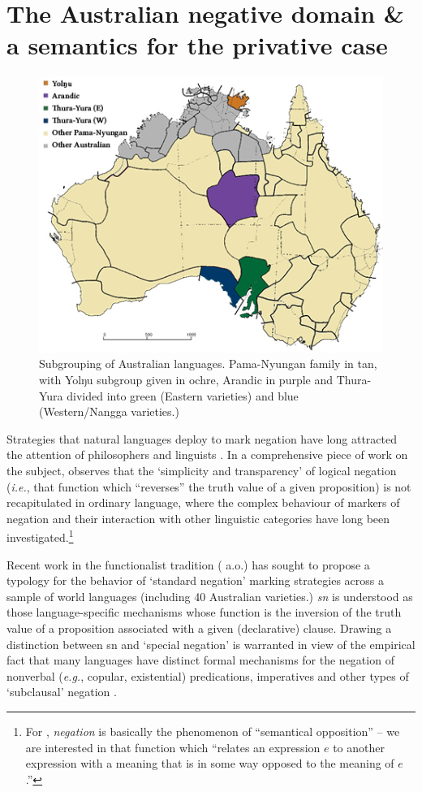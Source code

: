 \section{The Australian negative domain \& a semantics for the privative case}\label{typ-sec}
\begin{figure}\centering
	\includegraphics[scale=.7]{YolTYAr-leg.jpg}
	\caption[\textsc{map.} Pama-Nyungan subgroups investigated in Part \ref{NEC}]{Subgrouping of Australian languages. Pama-Nyungan family in tan, with Yolŋu subgroup given in ochre, Arandic in purple and Thura-Yura divided into green (Eastern varieties) and blue (Western/Nangga varieties.)}\label{Map}
\end{figure}

 Strategies that natural languages deploy to mark negation have long attracted the attention of philosophers and linguists \citep[see][]{Horn1989,Horn2010}. In a comprehensive piece of work on the subject, \citet[xiii--xiv]{Horn1989} observes that the ‘simplicity and transparency’ of logical negation (\textit{i.e.}, that function which ``reverses'' the truth value of a given proposition) is not recapitulated in ordinary language, where the complex behaviour of markers of negation and their interaction with other linguistic categories have long been investigated.\footnote{For \citet[1]{Horn2017}, \textit{negation} is basically the phenomenon of ``semantical opposition'' -- we are interested in that function which ``relates an expression $ e $ to another expression with a meaning that is in some way opposed to the meaning of $ e $.''}


 Recent work in the functionalist tradition (\citealp[\textit{e.g.},][]{Miestamo2005} a.o.) has sought to propose a typology for the behavior of `standard negation' marking strategies across a sample of world languages (including 40 Australian varieties.) \textit{\Acrfull{sn}} is understood as those language-specific mechanisms whose function is the inversion of the truth value of a proposition associated with a given (declarative) clause. Drawing a distinction between \acrshort{sn} and `special negation' is warranted in view of the empirical fact that many languages have distinct formal mechanisms for the negation of nonverbal (\textit{e.g.}, copular, existential) predications, imperatives and other types of `subclausal' negation \citep{Miestamo2007,Horn2017,Veselinova2013,VanderAuwera2005}.
